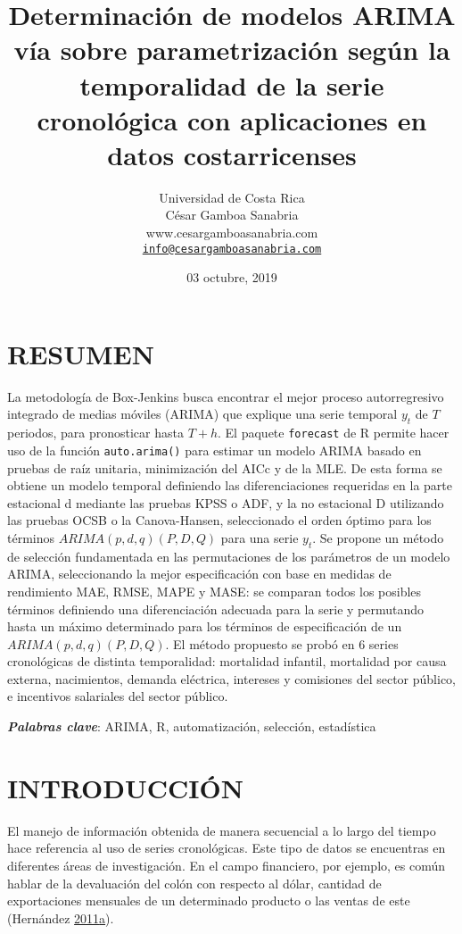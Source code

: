 \documentclass[]{article}
\title{Determinación de modelos ARIMA vía sobre parametrización según la
temporalidad de la serie cronológica con aplicaciones en datos
costarricenses}
\author{Universidad de Costa Rica\\
César Gamboa Sanabria\\
www.cesargamboasanabria.com\\
\href{mailto:info@cesargamboasanabria.com}{\nolinkurl{info@cesargamboasanabria.com}}}
\date{03 octubre, 2019}
\begin{document}
\maketitle

\newpage

\section*{RESUMEN}

La metodología de Box-Jenkins busca encontrar el mejor proceso
autorregresivo integrado de medias móviles (ARIMA) que explique una
serie temporal \(y_t\) de \(T\) periodos, para pronosticar hasta
\(T+h\). El paquete \texttt{forecast} de R permite hacer uso de la
función \texttt{auto.arima()} para estimar un modelo ARIMA basado en
pruebas de raíz unitaria, minimización del AICc y de la MLE. De esta
forma se obtiene un modelo temporal definiendo las diferenciaciones
requeridas en la parte estacional d mediante las pruebas KPSS o ADF, y
la no estacional D utilizando las pruebas OCSB o la Canova-Hansen,
seleccionado el orden óptimo para los términos \(ARIMA(p,d,q)(P,D,Q)\)
para una serie \(y_t\). Se propone un método de selección fundamentada
en las permutaciones de los parámetros de un modelo ARIMA, seleccionando
la mejor especificación con base en medidas de rendimiento MAE, RMSE,
MAPE y MASE: se comparan todos los posibles términos definiendo una
diferenciación adecuada para la serie y permutando hasta un máximo
determinado para los términos de especificación de un
\(ARIMA(p,d,q)(P,D,Q)\). El método propuesto se probó en 6 series
cronológicas de distinta temporalidad: mortalidad infantil, mortalidad
por causa externa, nacimientos, demanda eléctrica, intereses y
comisiones del sector público, e incentivos salariales del sector
público.

\textbf{\emph{Palabras clave}}: ARIMA, R, automatización, selección,
estadística

\newpage

\tableofcontents

\newpage

\section{INTRODUCCIÓN}

El manejo de información obtenida de manera secuencial a lo largo del
tiempo hace referencia al uso de series cronológicas. Este tipo de datos
se encuentras en diferentes áreas de investigación. En el campo
financiero, por ejemplo, es común hablar de la devaluación del colón con
respecto al dólar, cantidad de exportaciones mensuales de un determinado
producto o las ventas de este (Hernández
\protect\hyperlink{ref-oscarh-1}{2011}\protect\hyperlink{ref-oscarh-1}{a}).
\end{document}
